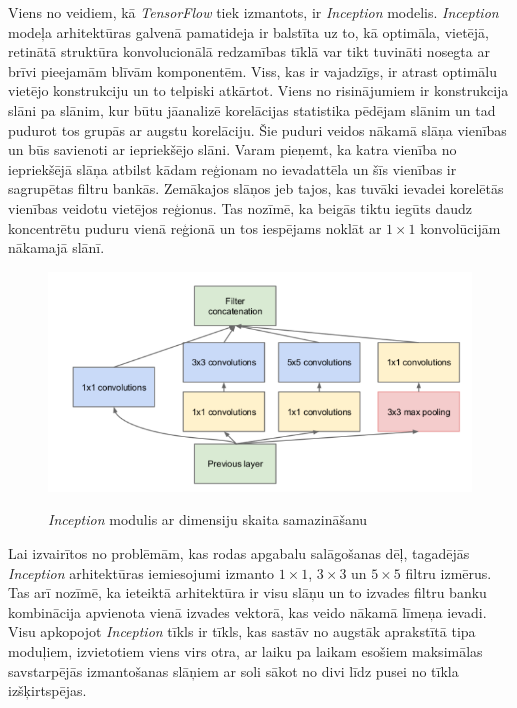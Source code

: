 \documentclass[12pt,paper=a4]{report}
\begin{document}
Viens no veidiem, kā \textit{TensorFlow} tiek izmantots, ir \textit{Inception} modelis. \textit{Inception} modeļa arhitektūras galvenā pamatideja ir balstīta uz to, kā optimāla, vietējā, retinātā struktūra konvolucionālā redzamības tīklā var tikt tuvināti nosegta ar brīvi pieejamām blīvām komponentēm. Viss, kas ir vajadzīgs, ir atrast optimālu vietējo konstrukciju un to telpiski atkārtot. Viens no risinājumiem ir konstrukcija slāni pa slānim, kur būtu jāanalizē korelācijas statistika pēdējam slānim un tad pudurot tos grupās ar augstu korelāciju. Šie puduri veidos nākamā slāņa vienības un būs savienoti ar iepriekšējo slāni. Varam pieņemt, ka katra vienība no iepriekšējā slāņa atbilst kādam reģionam no ievadattēla un šīs vienības ir sagrupētas filtru bankās. Zemākajos slāņos jeb tajos, kas tuvāki ievadei korelētās vienības veidotu vietējos reģionus. Tas nozīmē, ka beigās tiktu iegūts daudz koncentrētu puduru vienā reģionā un tos iespējams noklāt ar $1 \times 1$ konvolūcijām nākamajā slānī.\cite{inception}\par
\begin{figure}[h!]
\centering
\includegraphics[width=.7\linewidth]{inception2}
\label{fig:inception2}
\caption{\textit{Inception} modulis ar dimensiju skaita samazināšanu \cite{inception}}
\end{figure}
Lai izvairītos no problēmām, kas rodas apgabalu salāgošanas dēļ, tagadējās \textit{Inception} arhitektūras iemiesojumi izmanto $1 \times 1$, $3 \times 3$ un $5 \times 5$ filtru izmērus. Tas arī nozīmē, ka ieteiktā arhitektūra ir visu slāņu un to izvades filtru banku kombinācija apvienota vienā izvades vektorā, kas veido nākamā līmeņa ievadi. Visu apkopojot \textit{Inception} tīkls ir tīkls, kas sastāv no augstāk aprakstītā tipa moduļiem, izvietotiem viens virs otra, ar laiku pa laikam esošiem  maksimālas savstarpējās izmantošanas slāņiem ar soli sākot no divi līdz pusei no tīkla izšķirtspējas. \cite{inception}\par
\end{document}
